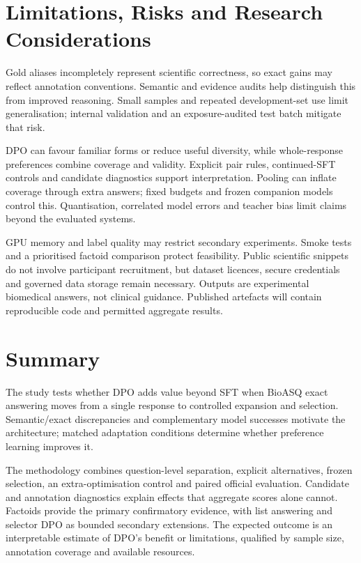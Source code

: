 \documentclass[12pt,a4paper]{article}
\begin{document}
\section{Limitations, Risks and Research Considerations}

Gold aliases incompletely represent scientific correctness, so exact gains may reflect annotation conventions. Semantic and evidence audits help distinguish this from improved reasoning. Small samples and repeated development-set use limit generalisation; internal validation and an exposure-audited test batch mitigate that risk.

DPO can favour familiar forms or reduce useful diversity, while whole-response preferences combine coverage and validity. Explicit pair rules, continued-SFT controls and candidate diagnostics support interpretation. Pooling can inflate coverage through extra answers; fixed budgets and frozen companion models control this. Quantisation, correlated model errors and teacher bias limit claims beyond the evaluated systems.

GPU memory and label quality may restrict secondary experiments. Smoke tests and a prioritised factoid comparison protect feasibility. Public scientific snippets do not involve participant recruitment, but dataset licences, secure credentials and governed data storage remain necessary. Outputs are experimental biomedical answers, not clinical guidance. Published artefacts will contain reproducible code and permitted aggregate results.

\section{Summary}

The study tests whether DPO adds value beyond SFT when BioASQ exact answering moves from a single response to controlled expansion and selection. Semantic/exact discrepancies and complementary model successes motivate the architecture; matched adaptation conditions determine whether preference learning improves it.

The methodology combines question-level separation, explicit alternatives, frozen selection, an extra-optimisation control and paired official evaluation. Candidate and annotation diagnostics explain effects that aggregate scores alone cannot. Factoids provide the primary confirmatory evidence, with list answering and selector DPO as bounded secondary extensions. The expected outcome is an interpretable estimate of DPO's benefit or limitations, qualified by sample size, annotation coverage and available resources.


\clearpage


\end{document}

